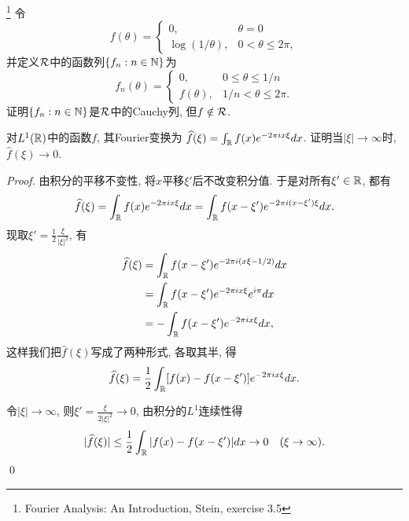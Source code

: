 \begin{example}\footnote{Fourier Analysis: An Introduction, Stein, exercise 3.5}
    令
    $$f(\theta) = \begin{cases}
        0, & \theta = 0 \\
        \log(1/\theta), & 0 < \theta \leq 2\pi,
    \end{cases}$$
    并定义$\mathcal{R}$中的函数列$\{f_n: n \in \mathbb{N}\}$为
    $$f_n(\theta) = \begin{cases}
        0,         & 0 \leq \theta \leq 1/n \\
        f(\theta), & 1/n < \theta \leq 2\pi.
    \end{cases}$$
    证明$\{f_n: n \in \mathbb{N}\}$是$\mathcal{R}$中的Cauchy列, 但$f \notin \mathcal{R}$. 
\end{example}

\begin{example}[~(黎曼-勒贝格引理)]
    对$L^1(\mathbb{R})$中的函数$f$, 其Fourier变换为
    $\widehat{f}(\xi) = \int_{\mathbb{R}} f(x)e^{-2\pi i x\xi}dx$.
    证明当$|\xi| \to \infty$时, $\hat{f}(\xi) \to 0$.
\end{example}
\begin{proof}

    由积分的平移不变性, 将$x$平移$\xi'$后不改变积分值. 于是对所有$\xi' \in \mathbb{R}$, 都有 
    $$\widehat{f}(\xi) = \int_{\mathbb{R}} f(x)e^{-2\pi ix\xi}dx 
    = \int_{\mathbb{R}} f(x-\xi')e^{-2\pi i(x-\xi')\xi}dx.$$
    现取$\xi' = \frac{1}{2}\frac{\xi}{|\xi|^2}$, 有
    \begin{align*}
    \widehat{f}(\xi) &= \int_{\mathbb{R}} f(x-\xi')e^{-2\pi i (x\xi - 1/2)}dx \\
    &= \int_{\mathbb{R}} f(x-\xi')e^{-2\pi i x\xi}e^{i\pi}dx \\
    &= -\int_{\mathbb{R}} f(x-\xi')e^{-2\pi i x\xi}dx, 
    \end{align*}
    这样我们把$\hat{f}(\xi)$写成了两种形式, 各取其半, 得 
    $$\widehat{f}(\xi) = \frac{1}{2} \int_{\mathbb{R}}[f(x)-f(x-\xi')]e^{-2\pi i x\xi}dx.$$
    
    令$|\xi| \to \infty$, 则$\xi' = \frac{\xi}{2|\xi|^2} \to 0$,
    由积分的$L^1$连续性得
    $$|\widehat{f}(\xi)| \leq \frac{1}{2}
     \int_{\mathbb{R}}|f(x)-f(x-\xi')|dx\to 0 \quad (\xi \to \infty).$$ \qed 
\end{proof}


